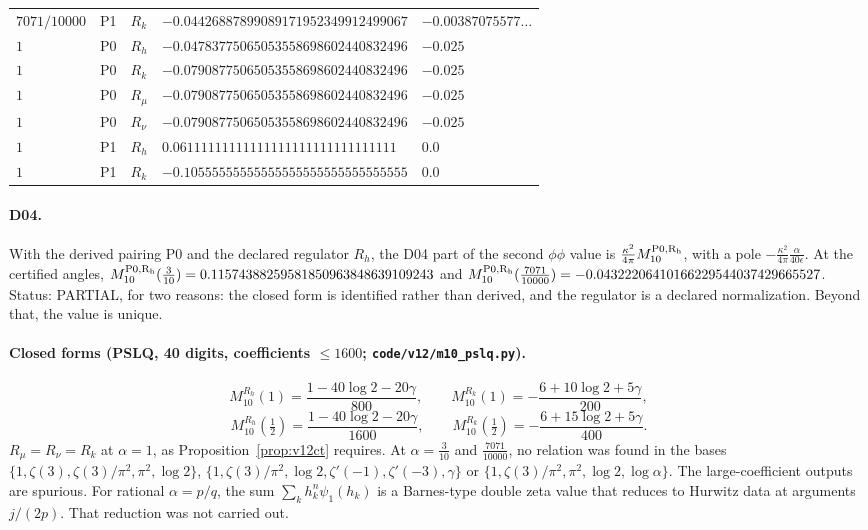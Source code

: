 \documentclass[11pt,a4paper]{article}
\newcommand{\loc}[1]{\nolinkurl{#1}}
\newcommand{\PARTIAL}{\textsf{PARTIAL}}
\theoremstyle{plain}
\theoremstyle{definition}
\theoremstyle{remark}
\numberwithin{equation}{section}
\begin{document}
\begin{center}
\begin{longtable}{@{}lllll@{}}
\(7071/10000\) & P1 & \(R_k\) & \(-0.04426887899089171952349912499067\) & \(-0.00387075577\ldots\)\\
\(1\) & P0 & \(R_h\) & \(-0.04783775065053558698602440832496\) & \(-0.025\)\\
\(1\) & P0 & \(R_k\) & \(-0.07908775065053558698602440832496\) & \(-0.025\)\\
\(1\) & P0 & \(R_\mu\) & \(-0.07908775065053558698602440832496\) & \(-0.025\)\\
\(1\) & P0 & \(R_\nu\) & \(-0.07908775065053558698602440832496\) & \(-0.025\)\\
\(1\) & P1 & \(R_h\) & \(0.06111111111111111111111111111111\) & \(0.0\)\\
\(1\) & P1 & \(R_k\) & \(-0.10555555555555555555555555555555\) & \(0.0\)\\
\bottomrule
\end{longtable}
\end{center}

\paragraph{D04.} With the derived pairing P0 and the declared
regulator \(R_h\), the D04 part of the second \(\phi\phi\) value is
\(\tfrac{\kappa^2}{4\pi}M_{10}^{\rm P0,R_h}\), with a pole
\(-\tfrac{\kappa^2}{4\pi}\tfrac{\alpha}{40\epsilon}\). At the
certified angles,
\(M_{10}^{\rm P0,R_h}(\tfrac3{10})=0.11574388259581850963848639109243\)
and
\(M_{10}^{\rm P0,R_h}(\tfrac{7071}{10000})=-0.04322206410166229544037429665527\).
Status: \PARTIAL, for two reasons: the closed form is identified
rather than derived, and the regulator is a declared normalization.
Beyond that, the value is unique.

\paragraph{Closed forms (PSLQ, 40 digits, coefficients \(\le1600\);
\loc{code/v12/m10_pslq.py}).}
\[
M_{10}^{R_h}(1)=\frac{1-40\log2-20\gamma}{800},\qquad
M_{10}^{R_k}(1)=-\frac{6+10\log2+5\gamma}{200},
\]
\[
M_{10}^{R_h}(\tfrac12)=\frac{1-40\log2-20\gamma}{1600},\qquad
M_{10}^{R_k}(\tfrac12)=-\frac{6+15\log2+5\gamma}{400}.
\]
\(R_\mu=R_\nu=R_k\) at \(\alpha=1\), as Proposition~\ref{prop:v12ct}
requires. At \(\alpha=\tfrac3{10}\) and \(\tfrac{7071}{10000}\), no
relation was found in the bases \(\{1,\zeta(3),\zeta(3)/\pi^2,\pi^2,\log2\}\),
\(\{1,\zeta(3)/\pi^2,\log2,\zeta'(-1),\zeta'(-3),\gamma\}\) or
\(\{1,\zeta(3)/\pi^2,\pi^2,\log2,\log\alpha\}\). The large-coefficient
outputs are spurious. For rational \(\alpha=p/q\), the sum
\(\sum_kh_k^n\psi_1(h_k)\) is a Barnes-type double zeta value that
reduces to Hurwitz data at arguments \(j/(2p)\). That reduction was
not carried out.
\end{document}
